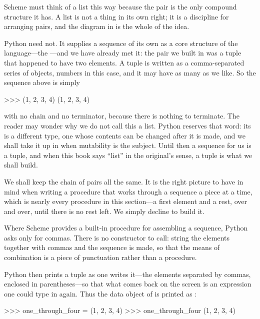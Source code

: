 \noindent
\begin{buildFromScarcity}
Scheme must think of a list this way because the pair is the only compound
structure it has.  A list is not a thing in its own right; it is a discipline
for arranging pairs, and the diagram in  is the whole of the
idea.

Python need not.  It supplies a sequence of its own as a core structure of the
language---the ---and we have already met it: the pair we built
in  was a tuple that happened to have two elements.  A tuple
is written as a comma-separated series of objects, numbers in this case, and it
may have as many as we like.  So the sequence above is simply

\begin{codeBlock}
>>> (1, 2, 3, 4)
(1, 2, 3, 4)
\end{codeBlock}

\noindent
with no chain and no terminator, because there is nothing to terminate.  The
reader may wonder why we do not call this a list.  Python reserves that word:
its  is a different type, one whose contents can be changed after it
is made, and we shall take it up in  when mutability is the
subject.  Until then a sequence for us is a tuple, and when this book says
``list'' in the original's sense, a tuple is what we shall build.

We shall keep the chain of pairs all the same.  It is the right picture to have
in mind when writing a procedure that works through a sequence a piece at a
time, which is nearly every procedure in this section---a first element and a
rest, over and over, until there is no rest left.  We simply decline to build
it.
\end{buildFromScarcity}

Where Scheme provides a built-in procedure  for assembling a
sequence, Python asks only for commas.  There is no constructor to call: string
the elements together with commas and the sequence is made, so that the means
of combination is a piece of punctuation rather than a procedure.

Python then prints a tuple as one writes it---the elements separated by commas,
enclosed in parentheses---so that what comes back on the screen is an
expression one could type in again.  Thus the data object of 
is printed as :

\begin{codeBlock}
>>> one_through_four = (1, 2, 3, 4)
>>> one_through_four
(1, 2, 3, 4)
\end{codeBlock}

